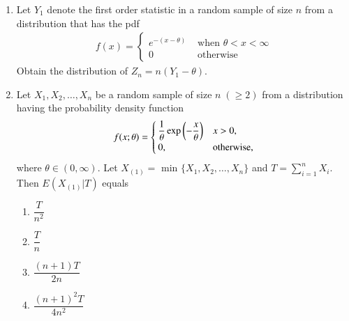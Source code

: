 \renewcommand{\theequation}{\theenumi}
\renewcommand{\thefigure}{\theenumi}
\renewcommand{\thetable}{\theenumi}
\begin{enumerate}[label=\thesection.\arabic*.,ref=\thesection.\theenumi]



\item Let $Y_1$ denote the first order statistic in a random sample of size $n$ from a distribution that has the pdf 
\begin{align}
    f(x) = 
    \begin{cases}
    e^{-(x-\theta)}&\text{ when } \theta<x<\infty\\
    0 &\text{  otherwise} 
    \end{cases}
\end{align}
Obtain the distribution of $Z_n = n(Y_1 - \theta)$.
%
\\
\solution

%
\item Let $X_1, X_2, \ldots , X_n$ be a random sample of size $n \; ( \geq 2 ) $ from a distribution having the probability density function
\begin{align}
f(x;\theta) = 
\begin{cases}
\dfrac{1}{\theta} \exp\left(-\dfrac{x}{\theta}\right) & x > 0, \\
0, & \text{otherwise,}
\end{cases}
\end{align}
where $\theta \in (0, \infty)$. Let $X_{(1)} = $ min $ \{ X_1, X_2, \ldots , X_n \} $ and $T = \sum_{i=1}^n X_i $. Then $E(X_{(1)} | T)$ equals 
\begin{enumerate}[label = (\Alph*)]
\item $\dfrac{T}{n^2}$ \\
\item $\dfrac{T}{n}$ \\
\item $\dfrac{(n+1)T}{2n}$ \\
\item $\dfrac{(n+1)^2 T}{4n^2}$
\end{enumerate}
\solution



\end{enumerate}